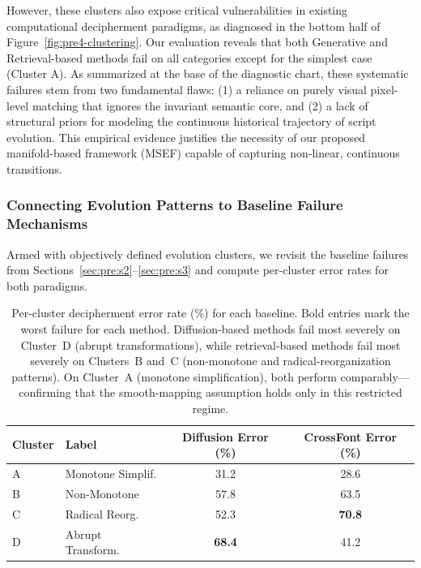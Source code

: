 \documentclass{article}
\begin{document}
However, these clusters also expose critical vulnerabilities in existing computational decipherment paradigms, as diagnosed in the bottom half of Figure~\ref{fig:pre4-clustering}. Our evaluation reveals that both Generative and Retrieval-based methods fail on all categories except for the simplest case (Cluster A). As summarized at the base of the diagnostic chart, these systematic failures stem from two fundamental flaws: (1) a reliance on purely visual pixel-level matching that ignores the invariant semantic core, and (2) a lack of structural priors for modeling the continuous historical trajectory of script evolution. This empirical evidence justifies the necessity of our proposed manifold-based framework (MSEF) capable of capturing non-linear, continuous transitions.

\subsubsection{Connecting Evolution Patterns to Baseline Failure Mechanisms}
\label{sec:pre:s9}

Armed with objectively defined evolution clusters, we revisit the baseline failures from Sections~\ref{sec:pre:s2}–\ref{sec:pre:s3} and compute per-cluster error rates for both paradigms.

\begin{table}[h]
  \centering
  \caption{Per-cluster decipherment error rate (\%) for each baseline. Bold entries mark the worst failure for each method. Diffusion-based methods fail most severely on Cluster~D (abrupt transformations), while retrieval-based methods fail most severely on Clusters~B and~C (non-monotone and radical-reorganization patterns). On Cluster~A (monotone simplification), both perform comparably—confirming that the smooth-mapping assumption holds only in this restricted regime.}
  \label{tab:pre:cross}
  \begin{tabular}{llcc}
    \toprule
    \textbf{Cluster} & \textbf{Label} &
    \textbf{Diffusion Error (\%)} &
    \textbf{CrossFont Error (\%)} \\
    \midrule
    A & Monotone Simplif.  & 31.2 & 28.6 \\
    B & Non-Monotone       & 57.8 & 63.5 \\
    C & Radical Reorg.     & 52.3 & \textbf{70.8} \\
    D & Abrupt Transform.  & \textbf{68.4} & 41.2 \\
    \bottomrule
  \end{tabular}
\end{table}
\end{document}
